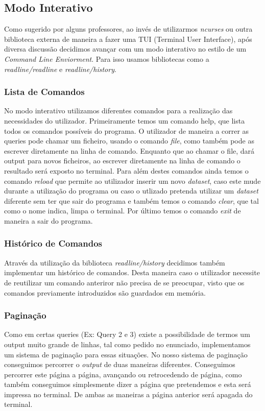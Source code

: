 \documentclass{article}
\begin{document}
    \subsection{Modo Interativo}
            Como sugerido por alguns professores, ao invés de utilizarmos \emph{ncurses} ou outra biblioteca externa de maneira a fazer uma TUI (Terminal User Interface), após diversa discussão decidimos avançar com um modo interativo no estilo de um \emph{Command Line Enviorment}. Para isso usamos bibliotecas como a \emph{readline/readline} e \emph{readline/history}. 
        \subsubsection{Lista de Comandos}
            No modo interativo utilizamos diferentes comandos para a realização das necessidades do utilizador.
            Primeiramente temos um comando help, que lista todos os comandos possíveis do programa. O utilizador de maneira a correr as queries pode chamar um ficheiro, usando o comando \emph{file}, como também pode as escrever diretamente na linha de comando. Enquanto que ao chamar o file, dará output para novos ficheiros, ao escrever diretamente na linha de comando o resultado será exposto no terminal.
            Para além destes comandos ainda temos o comando \emph{reload} que permite ao utilizador inserir um novo \emph{dataset}, caso este mude durante a utilização do programa ou caso o utlizado pretenda utilizar um \emph{dataset} diferente sem ter que sair do programa e também temos o comando \emph{clear}, que tal como o nome indica, limpa o terminal. Por último temos o comando \emph{exit} de maneira a sair do programa.
        \subsubsection{Histórico de Comandos}
            Através da utilização da biblioteca \emph{readline/history} decidimos também implementar um histórico de comandos. Desta maneira caso o utilizador necessite de reutilizar um comando anteriror
            não precisa de se preocupar, visto que os comandos previamente introduzidos são guardados em memória.
        \subsubsection{Paginação}
            Como em certas queries (Ex: Query 2 e 3) existe a possibilidade de termos um output muito grande de linhas, tal como pedido no enunciado, implementamos um sistema de paginação para essas situações.
            No nosso sistema de paginação conseguimos percorrer o \emph{output} de duas maneiras diferentes. Conseguimos percorrer este página a página, avançando ou retrocedendo de página, como também conseguimos simplesmente dizer a página que pretendemos e esta será impressa no terminal. De ambas as maneiras a página anterior será apagada do terminal.
\end{document}
